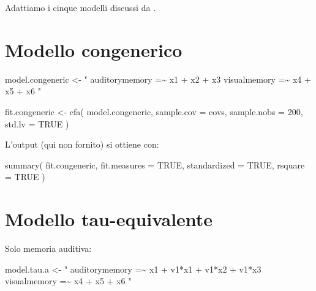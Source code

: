 \documentclass[
  11pt,
]{krantz}
\makeatletter
\newenvironment{Shaded}{\begin{snugshade}}{\end{snugshade}}
\newcommand{\AttributeTok}[1]{\textcolor[rgb]{0.61,0.61,0.61}{#1}}
\newcommand{\ConstantTok}[1]{\textcolor[rgb]{0,0,0}{#1}}
\newcommand{\DecValTok}[1]{\textcolor[rgb]{0.06,0.06,0.06}{#1}}
\newcommand{\FunctionTok}[1]{\textcolor[rgb]{0,0,0}{#1}}
\newcommand{\NormalTok}[1]{#1}
\newcommand{\OtherTok}[1]{\textcolor[rgb]{0.37,0.37,0.37}{#1}}
\newcommand{\StringTok}[1]{\textcolor[rgb]{0.5,0.5,0.5}{#1}}
\newenvironment{kframe}{%
\medskip{}
\setlength{\fboxsep}{.8em}
 \def\at@end@of@kframe{}%
 \ifinner\ifhmode%
  \def\at@end@of@kframe{\end{minipage}}%
  \begin{minipage}{\columnwidth}%
 \fi\fi%
 \def\FrameCommand##1{\hskip\@totalleftmargin \hskip-\fboxsep
 \colorbox{shadecolor}{##1}\hskip-\fboxsep
     \hskip-\linewidth \hskip-\@totalleftmargin \hskip\columnwidth}%
 \MakeFramed {\advance\hsize-\width
   \@totalleftmargin\z@ \linewidth\hsize
   \@setminipage}}%
 {\par\unskip\endMakeFramed%
 \at@end@of@kframe}
\renewenvironment{Shaded}{\begin{kframe}}{\end{kframe}}
\theoremstyle{definition}
\theoremstyle{definition}
\theoremstyle{definition}
\theoremstyle{definition}
\theoremstyle{remark}
\makeatother
\begin{document}
Adattiamo i cinque modelli discussi da \citet{brown2015confirmatory}.

\hypertarget{modello-congenerico}{%
\section{Modello congenerico}\label{modello-congenerico}}

\begin{Shaded}
\begin{Highlighting}[]
\NormalTok{model.congeneric }\OtherTok{\textless{}{-}} \StringTok{"}
\StringTok{  auditorymemory =\textasciitilde{} x1 + x2 + x3}
\StringTok{  visualmemory   =\textasciitilde{} x4 + x5 + x6}
\StringTok{"}
\end{Highlighting}
\end{Shaded}

\begin{Shaded}
\begin{Highlighting}[]
\NormalTok{fit.congeneric }\OtherTok{\textless{}{-}} \FunctionTok{cfa}\NormalTok{(}
\NormalTok{  model.congeneric,}
  \AttributeTok{sample.cov =}\NormalTok{ covs,}
  \AttributeTok{sample.nobs =} \DecValTok{200}\NormalTok{,}
  \AttributeTok{std.lv =} \ConstantTok{TRUE}
\NormalTok{)}
\end{Highlighting}
\end{Shaded}

L'output (qui non fornito) si ottiene con:

\begin{Shaded}
\begin{Highlighting}[]
\FunctionTok{summary}\NormalTok{(}
\NormalTok{  fit.congeneric,}
  \AttributeTok{fit.measures =} \ConstantTok{TRUE}\NormalTok{,}
  \AttributeTok{standardized =} \ConstantTok{TRUE}\NormalTok{,}
  \AttributeTok{rsquare =} \ConstantTok{TRUE}
\NormalTok{)}
\end{Highlighting}
\end{Shaded}

\hypertarget{modello-tau-equivalente}{%
\section{Modello tau-equivalente}\label{modello-tau-equivalente}}

Solo memoria auditiva:

\begin{Shaded}
\begin{Highlighting}[]
\NormalTok{model.tau.a }\OtherTok{\textless{}{-}} \StringTok{"}
\StringTok{  auditorymemory =\textasciitilde{} x1 + v1*x1 + v1*x2 + v1*x3}
\StringTok{  visualmemory   =\textasciitilde{} x4 + x5 + x6}
\StringTok{"}
\end{Highlighting}
\end{Shaded}
\end{document}
